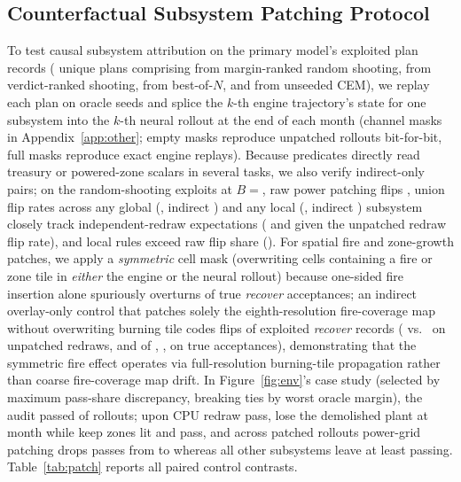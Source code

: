 \subsection{Counterfactual Subsystem Patching Protocol}\label{app:patching}

To test causal subsystem attribution on the primary model's \PtRecords{} exploited plan records (\PtPlans{} unique plans comprising \PtNRand{} from margin-ranked random shooting, \PtNVerd{} from verdict-ranked shooting, \PtNBon{} from best-of-$N$, and \PtNCem{} from unseeded CEM), we replay each plan on \PatchSeeds{} oracle seeds and splice the $k$-th engine trajectory's state for one subsystem into the $k$-th neural rollout at the end of each month (channel masks in Appendix~\ref{app:other}; empty masks reproduce unpatched rollouts bit-for-bit, full masks reproduce exact engine replays). Because predicates directly read treasury or powered-zone scalars in several tasks, we also verify indirect-only pairs; on the \DecRecords{} random-shooting exploits at $B ={}$, raw power patching flips \DecPower{} \ci{\DecPowerCI}, union flip rates across any global (\DecAnyGlobal{}, indirect \DecAnyGlobalInd{}) and any local (\DecAnyLocal{}, indirect \DecAnyLocalInd{}) subsystem closely track independent-redraw expectations (\PcPredGlobalInd{} and \PcPredLocal{} given the \PcRedraw{} unpatched redraw flip rate), and \DecLocalAboveN{} local rules exceed \MechLocalBar{} raw flip share (\DecLocalAbove{}). For spatial fire and zone-growth patches, we apply a \emph{symmetric} cell mask (overwriting cells containing a fire or zone tile in \emph{either} the engine or the neural rollout) because one-sided fire insertion alone spuriously overturns \PcTaOneSided{} of true \emph{recover} acceptances; an indirect overlay-only control that patches solely the eighth-resolution fire-coverage map without overwriting burning tile codes flips \PcFireOvK{} of \PcFireOvN{} exploited \emph{recover} records (\PcFireOv{} \ci{\PcFireOvCI} vs.\ \PcFireOvNone{} on unpatched redraws, and \PcFireOvTaK{} of \PcTaN{}, \PcFireOvTa{}, on true acceptances), demonstrating that the symmetric fire effect operates via full-resolution burning-tile propagation rather than coarse fire-coverage map drift. In Figure~\ref{fig:env}'s case study (selected by maximum pass-share discrepancy, breaking ties by worst oracle margin), the audit passed \FigOneAuditPass{} of \FigOneK{} rollouts; upon CPU redraw \FigOneEmuPass{} pass, \FigOneEmuLose{} lose the demolished plant at month \FigOneDropMonth{} while \FigOneEmuLosePass{} keep zones lit and pass, and across \FigOnePatchK{} patched rollouts power-grid patching drops passes from \FigOnePatchNone{} to \FigOnePatchPower{} whereas all other subsystems leave at least \FigOnePatchOtherMin{} passing. Table~\ref{tab:patch} reports all paired control contrasts.

